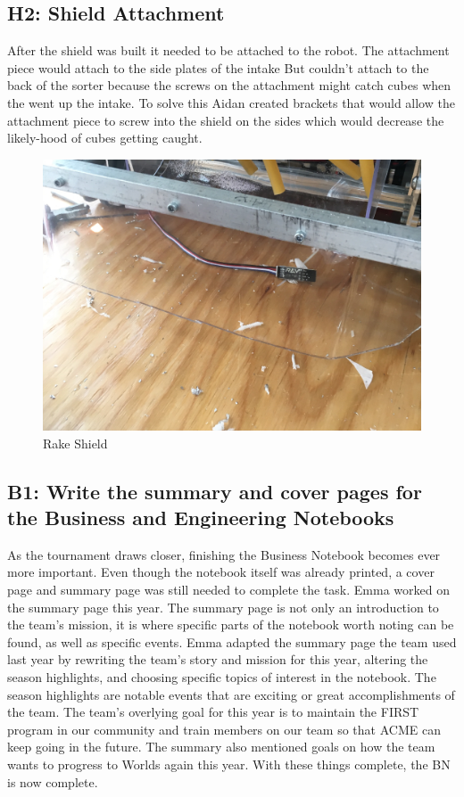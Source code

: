 \documentclass{article}
\begin{document}
\subsection{H2: Shield Attachment}

After the shield was built it needed to be attached to the robot. The attachment piece would attach to the side plates of the intake But couldn't attach to the back of the sorter because the screws on the attachment might catch cubes when the went up the intake. To solve this Aidan created brackets that would allow the attachment piece to screw into the shield on the sides which would decrease the likely-hood of cubes getting caught.

\begin{figure}
    \centering
    \includegraphics[width=.6 \textwidth]{11_11-12/images/rake.jpg}
    \caption{Rake Shield}
    \label{fig:rakeshield}
\end{figure}\subsection{B1: Write the summary and cover pages for the Business and Engineering Notebooks}

As the tournament draws closer, finishing the Business Notebook becomes ever more important. Even though the notebook itself was already printed, a cover page and summary page was still needed to complete the task. Emma worked on the summary page this year. The summary page is not only an introduction to the team's mission, it is where specific parts of the notebook worth noting can be found, as well as specific events. Emma adapted the summary page the team used last year by rewriting the team's story and mission for this year, altering the season highlights, and choosing specific topics of interest in the notebook. The season highlights are notable events that are exciting or great accomplishments of the team. The team's overlying goal for this year is to maintain the FIRST program in our community and train members on our team so that ACME can keep going in the future. The summary also mentioned goals on how the team wants to progress to Worlds again this year. With these things complete, the BN is now complete.  
\end{document}
